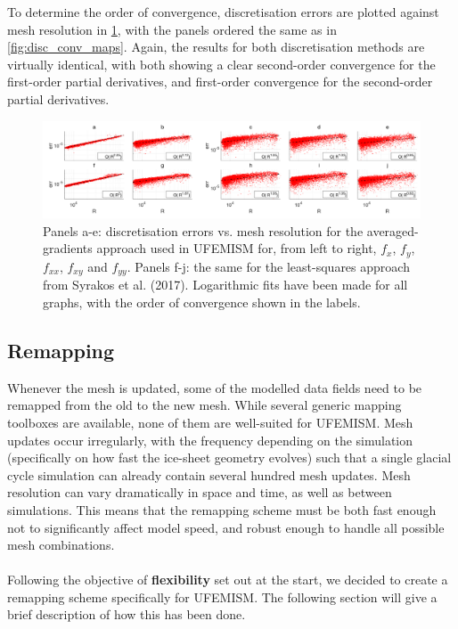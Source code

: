\documentclass{article}
\begin{document}
To determine the order of convergence, discretisation errors are plotted against mesh resolution in \ref{fig:disc_conv_order}, with the panels ordered the same as in \ref{fig:disc_conv_maps}. Again, the results for both discretisation methods are virtually identical, with both showing a clear second-order convergence for the first-order partial derivatives, and first-order convergence for the second-order partial derivatives.

\begin{figure}[h!] \label{fig:disc_conv_order}
  \includegraphics[width=0.9\linewidth]{Fig_discretisation_convergence_order.png}
  \caption{Panels a-e: discretisation errors vs. mesh resolution for the averaged-gradients approach used in UFEMISM for, from left to right, $f_x$, $f_y$, $f_{xx}$, $f_{xy}$ and $f_{yy}$. Panels f-j: the same for the least-squares approach from Syrakos et al. (2017). Logarithmic fits have been made for all graphs, with the order of convergence shown in the labels.}
\end{figure}


\newpage
\subsection{Remapping}

Whenever the mesh is updated, some of the modelled data fields need to be remapped from the old to the new mesh. While several generic mapping toolboxes are available, none of them are well-suited for UFEMISM. Mesh updates occur irregularly, with the frequency depending on the simulation (specifically on how fast the ice-sheet geometry evolves) such that a single glacial cycle simulation can already contain several hundred mesh updates. Mesh resolution can vary dramatically in space and time, as well as between simulations. This means that the remapping scheme must be both fast enough not to significantly affect model speed, and robust enough to handle all possible mesh combinations.\\
\\
Following the objective of \textbf{flexibility} set out at the start, we decided to create a remapping scheme specifically for UFEMISM. The following section will give a brief description of how this has been done.
\end{document}
